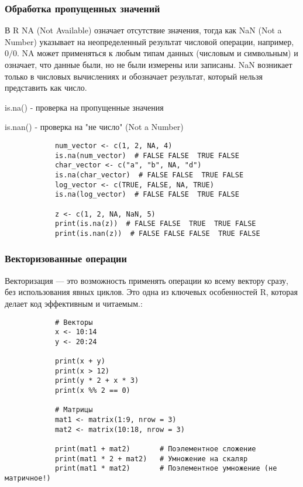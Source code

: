 \documentclass[10pt]{beamer}
\begin{document}
	
	\begin{frame}[fragile]
		\frametitle{Обработка пропущенных значений}
		В R NA (Not Available) означает отсутствие значения, тогда как NaN (Not a Number) указывает на неопределенный результат числовой операции, например, \(0/0\). NA может применяться к любым типам данных (числовым и символьным) и означает, что данные были, но не были измерены или записаны. NaN возникает только в числовых вычислениях и обозначает результат, который нельзя представить как число. 
		
		is.na() - проверка на пропущенные значения
		
		is.nan() - проверка на "не число" (Not a Number)
		{\fontsize{7}{7}\selectfont
		\begin{verbatim}
			num_vector <- c(1, 2, NA, 4)
			is.na(num_vector)  # FALSE FALSE  TRUE FALSE
			char_vector <- c("a", "b", NA, "d")
			is.na(char_vector)  # FALSE FALSE  TRUE FALSE
			log_vector <- c(TRUE, FALSE, NA, TRUE)
			is.na(log_vector)  # FALSE FALSE  TRUE FALSE
			
			z <- c(1, 2, NA, NaN, 5)
			print(is.na(z))  # FALSE FALSE  TRUE  TRUE FALSE
			print(is.nan(z))  # FALSE FALSE FALSE  TRUE FALSE
	    \end{verbatim}	}
	\end{frame}
	
	
	
	
	\begin{frame}[fragile]
		\frametitle{Векторизованные операции}
		Векторизация — это возможность применять операции ко всему вектору сразу, без использования явных циклов. Это одна из ключевых особенностей R, которая делает код эффективным и читаемым.:
		{\fontsize{8}{9}\selectfont
		\begin{verbatim}
			# Векторы
			x <- 10:14
			y <- 20:24
			
			print(x + y)
			print(x > 12)
			print(y * 2 + x * 3)
			print(x %% 2 == 0)
			
			# Матрицы
			mat1 <- matrix(1:9, nrow = 3)
			mat2 <- matrix(10:18, nrow = 3)
			
			print(mat1 + mat2)       # Поэлементное сложение
			print(mat1 * 2 + mat2)   # Умножение на скаляр
			print(mat1 * mat2)       # Поэлементное умножение (не матричное!)   
		\end{verbatim}
	}
	\end{frame}
	
	
	
	
\end{document}
